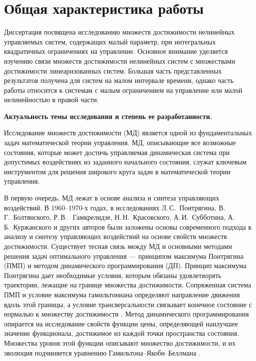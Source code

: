 \documentclass[../abstract.tex]{subfiles}
\begin{document}
\clearpage
\section*{Общая характеристика работы}
Диссертация посвящена исследованию множеств достижимости нелинейных управляемых систем, содержащих малый параметр, при интегральных квадратичных ограничениях на управление.
Основное внимание уделяется изучению связи множеств достижимости нелинейных систем с множествами достижимости линеаризованных систем. 
Большая часть представленных результатов получена для систем на малом интервале времени, однако часть работы относится к системам с малым ограничением на управление или малой нелинейностью в правой части. 

\textbf{Актуальность темы исследования и степень ее разработанности.} 

Исследование множеств достижимости (МД) является одной из фундаментальных задач математической теории управления. 
МД, описывающие все возможные состояния, которые может достичь управляемая динамическая система при допустимых воздействиях из заданного начального состояния, служат ключевым инструментом для решения широкого круга задач в математической теории управления. 

В первую очередь, МД лежат в основе анализа и синтеза управляющих воздействий. 
В 1960–1970-х годах, в исследованиях Л.\,С.~Понтрягина, В.\,Г.~Болтянского, Р.\,В. ~Гамкрелидзе, Н.\,Н.~Красовского, А.\,И.~Субботина, А.\,Б.~Куржанского и других авторов \cite{Boltyansky, Pontryagin1961, Pontryagin1967, Gamkrelidze, Kras_book, KrasSub, Kurzhanski1977} были заложены основы современного подхода к анализу и синтезу управляющих воздействий на основе свойств множеств достижимости.
Существует тесная связь между МД и основными методами решения задач оптимального управления --- принципом максимума Понтрягина (ПМП) и методом динамического программирования (ДП).
Принцип максимума Понтрягина дает необходимые условия, которым обязаны удовлетворять траектории, лежащие на границе множества достижимости. 
Сопряженная система ПМП и условие максимума гамильтониана определяют направление движения вдоль этой границы, а условие трансверсальности связывает конечное состояние с нормалью к множеству достижимости \cite{Pontryagin1961, Lee}.
Метод динамического программирования опирается на исследование свойств функции цены, определяющей наилучшее значение функционала, достижимое из каждой точки пространства состояния. 
Множества уровня этой функции описывают множество достижимости, и их эволюция подчиняется уравнению Гамильтона–Якоби–Беллмана \cite{Bellman, Kurzhanski1977, GurmanDuhta, Mitchell2002, Osher, Sethian}. 
\end{document}
